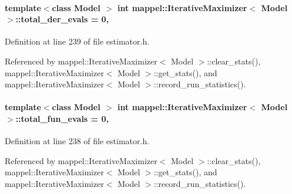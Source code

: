 \paragraph[{\texorpdfstring{total\+\_\+der\+\_\+evals}{total_der_evals}}]{\setlength{\rightskip}{0pt plus 5cm}template$<$class Model $>$ int {\bf mappel\+::\+Iterative\+Maximizer}$<$ Model $>$\+::total\+\_\+der\+\_\+evals = 0\hspace{0.3cm}{\ttfamily [protected]}, {\ttfamily [inherited]}}\hypertarget{classmappel_1_1IterativeMaximizer_a76de3653a5f2c200ad6865372eb9c154}{}\label{classmappel_1_1IterativeMaximizer_a76de3653a5f2c200ad6865372eb9c154}


Definition at line 239 of file estimator.\+h.



Referenced by mappel\+::\+Iterative\+Maximizer$<$ Model $>$\+::clear\+\_\+stats(), mappel\+::\+Iterative\+Maximizer$<$ Model $>$\+::get\+\_\+stats(), and mappel\+::\+Iterative\+Maximizer$<$ Model $>$\+::record\+\_\+run\+\_\+statistics().

\paragraph[{\texorpdfstring{total\+\_\+fun\+\_\+evals}{total_fun_evals}}]{\setlength{\rightskip}{0pt plus 5cm}template$<$class Model $>$ int {\bf mappel\+::\+Iterative\+Maximizer}$<$ Model $>$\+::total\+\_\+fun\+\_\+evals = 0\hspace{0.3cm}{\ttfamily [protected]}, {\ttfamily [inherited]}}\hypertarget{classmappel_1_1IterativeMaximizer_afbb76db27b845efa8e958611dd3c8d3c}{}\label{classmappel_1_1IterativeMaximizer_afbb76db27b845efa8e958611dd3c8d3c}


Definition at line 238 of file estimator.\+h.



Referenced by mappel\+::\+Iterative\+Maximizer$<$ Model $>$\+::clear\+\_\+stats(), mappel\+::\+Iterative\+Maximizer$<$ Model $>$\+::get\+\_\+stats(), and mappel\+::\+Iterative\+Maximizer$<$ Model $>$\+::record\+\_\+run\+\_\+statistics().

